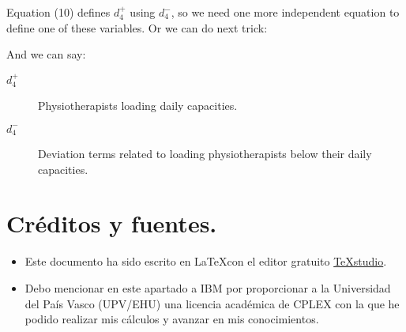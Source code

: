 \documentclass[a4paper,12pt]{article}
\begin{document}
Equation (10) defines $d_4^+$ using $d_4^-$, so we need one more independent equation to define one of these variables. Or we can do next trick:
\begin{lpformulation}
\end{lpformulation}
And we can say:
\begin{description}
	\item[$d_4^+$] Physiotherapists loading daily capacities.
	\item[$d_4^-$] Deviation terms related to loading physiotherapists below their daily capacities.
\end{description}



	
\section{Créditos y fuentes.}
	
	\begin{itemize}
		\item Este documento ha sido escrito en \LaTeX con el editor gratuito  \href{https://www.texstudio.org/}{TeXstudio}.
		\item Debo mencionar en este apartado a IBM por proporcionar a la Universidad del País Vasco (UPV/EHU) una licencia académica de CPLEX \texttrademark con la que he podido realizar mis cálculos y avanzar en mis conocimientos.
	\end{itemize}
	
	
	
	
	
\end{document}
